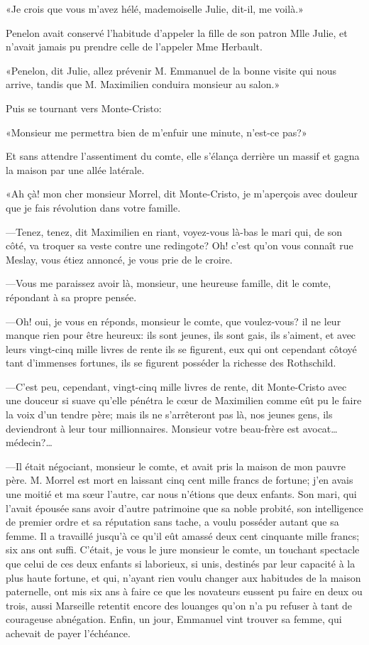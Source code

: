 «Je crois que vous m'avez hélé, mademoiselle Julie, dit-il, me voilà.» 

Penelon avait conservé l'habitude d'appeler la fille de son patron Mlle Julie, et n'avait jamais pu prendre celle de l'appeler Mme Herbault. 

«Penelon, dit Julie, allez prévenir M. Emmanuel de la bonne visite qui nous arrive, tandis que M. Maximilien conduira monsieur au salon.» 

Puis se tournant vers Monte-Cristo: 

«Monsieur me permettra bien de m'enfuir une minute, n'est-ce pas?» 

Et sans attendre l'assentiment du comte, elle s'élança derrière un massif et gagna la maison par une allée latérale. 

«Ah çà! mon cher monsieur Morrel, dit Monte-Cristo, je m'aperçois avec douleur que je fais révolution dans votre famille. 

—Tenez, tenez, dit Maximilien en riant, voyez-vous là-bas le mari qui, de son côté, va troquer sa veste contre une redingote? Oh! c'est qu'on vous connaît rue Meslay, vous étiez annoncé, je vous prie de le croire. 

—Vous me paraissez avoir là, monsieur, une heureuse famille, dit le comte, répondant à sa propre pensée. 

—Oh! oui, je vous en réponds, monsieur le comte, que voulez-vous? il ne leur manque rien pour être heureux: ils sont jeunes, ils sont gais, ils s'aiment, et avec leurs vingt-cinq mille livres de rente ils se figurent, eux qui ont cependant côtoyé tant d'immenses fortunes, ils se figurent posséder la richesse des Rothschild. 

—C'est peu, cependant, vingt-cinq mille livres de rente, dit Monte-Cristo avec une douceur si suave qu'elle pénétra le cœur de Maximilien comme eût pu le faire la voix d'un tendre père; mais ils ne s'arrêteront pas là, nos jeunes gens, ils deviendront à leur tour millionnaires. Monsieur votre beau-frère est avocat\dots médecin?\dots 

—Il était négociant, monsieur le comte, et avait pris la maison de mon pauvre père. M. Morrel est mort en laissant cinq cent mille francs de fortune; j'en avais une moitié et ma sœur l'autre, car nous n'étions que deux enfants. Son mari, qui l'avait épousée sans avoir d'autre patrimoine que sa noble probité, son intelligence de premier ordre et sa réputation sans tache, a voulu posséder autant que sa femme. Il a travaillé jusqu'à ce qu'il eût amassé deux cent cinquante mille francs; six ans ont suffi. C'était, je vous le jure monsieur le comte, un touchant spectacle que celui de ces deux enfants si laborieux, si unis, destinés par leur capacité à la plus haute fortune, et qui, n'ayant rien voulu changer aux habitudes de la maison paternelle, ont mis six ans à faire ce que les novateurs eussent pu faire en deux ou trois, aussi Marseille retentit encore des louanges qu'on n'a pu refuser à tant de courageuse abnégation. Enfin, un jour, Emmanuel vint trouver sa femme, qui achevait de payer l'échéance. 

